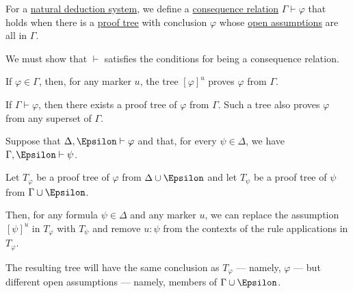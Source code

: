 \begin{definition}\label{def:natural_deduction_entailment}
  For a \hyperref[def:natural_deduction_system]{natural deduction system}, we define a \hyperref[def:consequence_relation]{consequence relation} \( \Gamma \vdash \varphi \) that holds when there is a \hyperref[def:natural_deduction_proof_tree]{proof tree} with conclusion \( \varphi \) whose \hyperref[def:natural_deduction_open_assumptions]{open assumptions} are all in \( \Gamma \).
\end{definition}
\begin{defproof}
  We must show that \( {\vdash} \) satisfies the conditions for being a consequence relation.

   If \( \varphi \in \Gamma \), then, for any marker \( u \), the tree \( [\varphi]^u \) proves \( \varphi \) from \( \Gamma \).

   If \( \Gamma \vdash \varphi \), then there exists a proof tree of \( \varphi \) from \( \Gamma \). Such a tree also proves \( \varphi \) from any superset of \( \Gamma \).

   Suppose that \( \Delta, \Epsilon \vdash \varphi \) and that, for every \( \psi \in \Delta \), we have \( \Gamma, \Epsilon \vdash \psi \).

  Let \( T_\varphi \) be a proof tree of \( \varphi \) from \( \Delta \cup \Epsilon \) and let \( T_\psi \) be a proof tree of \( \psi \) from \( \Gamma \cup \Epsilon \).

  Then, for any formula \( \psi \in \Delta \) and any marker \( u \), we can replace the assumption \( [\psi]^u \) in \( T_\varphi \) with \( T_\psi \) and remove \( u: \psi \) from the contexts of the rule applications in \( T_\varphi \).

  The resulting tree will have the same conclusion as \( T_\varphi \) --- namely, \( \varphi \) --- but different open assumptions --- namely, members of \( \Gamma \cup \Epsilon \).
\end{defproof}

